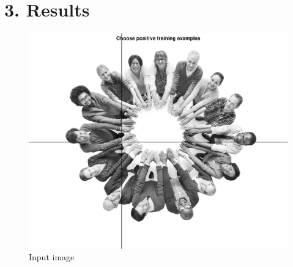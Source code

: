 \documentclass{article}
\newcommand{\tl}[1]{\textlatin{#1}}
\begin{document}
	\section*{3. \tl{Results}}
	\begin{figure}[H]
		\centering
		\includegraphics[scale=0.4]{res/input_image.eps}
		\caption{\tl{Input image}}
	\end{figure}%
\end{document}
